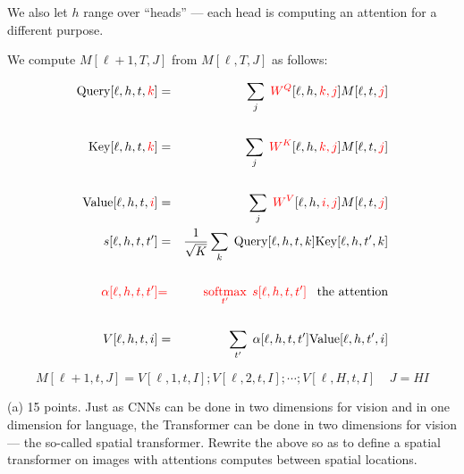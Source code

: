 \documentclass{article}
\begin{document}
\medskip
We also let $h$ range over ``heads'' --- each head is computing an attention for a different purpose.

\medskip
We compute $M[\ell+1,T,J]$ from $M[\ell,T,J]$ as follows:
      
\begin{eqnarray*}
\mathrm{Query}[\ell,h,t,{\color{red} k}] & = & \sum_j\;{\color{red} W^Q}[\ell,h,{\color{red} k,j}]M[\ell,t,{\color{red} j}] \\
\\
\mathrm{Key}[\ell,h,t,{\color{red} k}] & = & \sum_j\;{\color{red} W^K}[\ell,h,{\color{red} k,j}]M[\ell,t,{\color{red} j}] \\
\\
\mathrm{Value}[\ell,h,t,{\color{red} i}] & = & \sum_j\;{\color{red} W^V}[\ell,h,{\color{red} i,j}]M[\ell,t,{\color{red} j}]
\\
s[\ell,h,t,t'] & = &\frac{1}{\sqrt{K}} \sum_k\;\mathrm{Query}[\ell,h,t,k]\mathrm{Key}[\ell,h,t',k] \\
\\
{\color{red} \alpha[\ell,h,t,t']} & {\color{red} =} & {\color{red} \operatorname*{softmax}_{t'} \;s[\ell,h,t,t']}\;\;\;\mbox{the attention} \\
\\
V[\ell,h,t,i] & = & \sum_{t'}\;\alpha[\ell,h,t,t']\mathrm{Value}[\ell,h,t',i]
\end{eqnarray*}


$$M[\ell+1,t,J] = V[\ell,1,t,I];V[\ell,2,t,I];\cdots;V[\ell,H,t,I] \;\;\;\; J = HI$$

\medskip
(a) 15 points. Just as CNNs can be done in two dimensions for vision and in one dimension for language, the Transformer can be done in two dimensions for vision --- the so-called spatial transformer.
Rewrite the above so as to define a spatial transformer on images with attentions computes between spatial locations.
\end{document}

